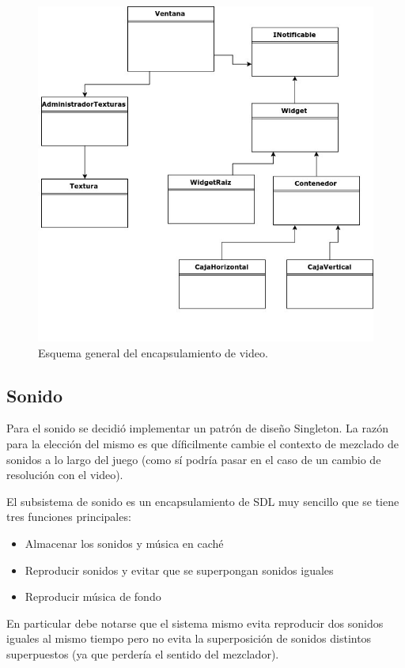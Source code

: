 \documentclass[titlepage,a4paper,12pt]{article}
\begin{document}
\begin{figure}[H]
	\centering
	\includegraphics[width=12cm]{../imagenes/cliente-esquema-video.jpg}
	\caption{\label{fig:cliente-esquema-video} Esquema general del encapsulamiento de video.}
\end{figure}

\subsection{Sonido}
Para el sonido se decidió implementar un patrón de diseño Singleton. La razón para la elección del mismo es que díficilmente cambie el contexto de mezclado de sonidos a lo largo del juego (como sí podría pasar en el caso de un cambio de resolución con el video).

El subsistema de sonido es un encapsulamiento de SDL muy sencillo que se tiene tres funciones principales:
\begin{itemize}
\item Almacenar los sonidos y música en caché
\item Reproducir sonidos y evitar que se superpongan sonidos iguales
\item Reproducir música de fondo
\end{itemize}

En particular debe notarse que el sistema mismo evita reproducir dos sonidos iguales al mismo tiempo pero no evita la superposición de  sonidos distintos superpuestos (ya que perdería el sentido del mezclador).
\end{document}
